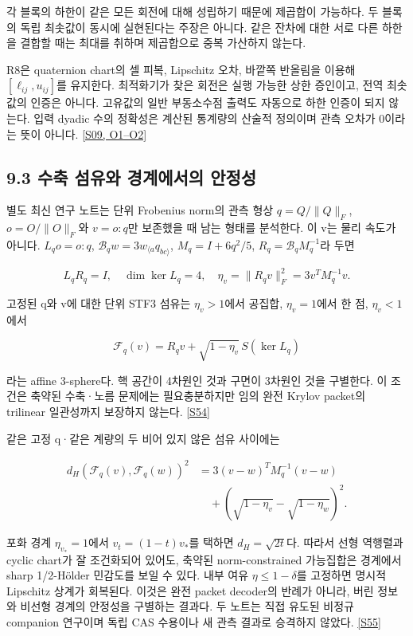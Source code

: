 \documentclass[11pt,a4paper]{article}
\begin{document}
각 블록의 하한이 같은 모든 회전에 대해 성립하기 때문에 제곱합이 가능하다. 두 블록의 독립 최솟값이 동시에 실현된다는 주장은 아니다. 같은 잔차에 대한 서로 다른 하한을 결합할 때는 최대를 취하며 제곱합으로 중복 가산하지 않는다.


R8은 quaternion chart의 셀 피복, Lipschitz 오차, 바깥쪽 반올림을 이용해 \([\ell_{ij},u_{ij}]\)를 유지한다. 최적화기가 찾은 회전은 실행 가능한 상한 증인이고, 전역 최솟값의 인증은 아니다. 고유값의 일반 부동소수점 출력도 자동으로 하한 인증이 되지 않는다. 입력 dyadic 수의 정확성은 계산된 통계량의 산술적 정의이며 관측 오차가 0이라는 뜻이 아니다. \hyperlink{src:S09}{[S09, O1–O2]}


\subsection*{9.3 수축 섬유와 경계에서의 안정성}

별도 최신 연구 노트는 단위 Frobenius norm의 관측 형상 \(q=Q/\|Q\|_F\), \(o=O/\|O\|_F\)와 \(v=o:q\)만 보존했을 때 남는 형태를 분석한다. 이 v는 물리 속도가 아니다. \(L_qo=o:q\), \(\mathcal B_qw=3w_{\langle a}q_{bc\rangle}\), \(M_q=I+6q^2/5\), \(R_q=\mathcal B_qM_q^{-1}\)라 두면


\[
L_qR_q=I,\quad \dim\ker L_q=4,\quad
\eta_v=\|R_qv\|_F^2=3v^TM_q^{-1}v.
\]

고정된 q와 v에 대한 단위 STF3 섬유는 \(\eta_v>1\)에서 공집합, \(\eta_v=1\)에서 한 점, \(\eta_v<1\)에서


\[
\mathcal F_q(v)=R_qv+\sqrt{1-\eta_v}\,S(\ker L_q)
\]

라는 affine 3-sphere다. 핵 공간이 4차원인 것과 구면이 3차원인 것을 구별한다. 이 조건은 축약된 수축·노름 문제에는 필요충분하지만 임의 완전 Krylov packet의 trilinear 일관성까지 보장하지 않는다. \hyperlink{src:S54}{[S54]}


같은 고정 q·같은 계량의 두 비어 있지 않은 섬유 사이에는


\[
\begin{aligned}
d_H(\mathcal F_q(v),\mathcal F_q(w))^2
&=3(v-w)^TM_q^{-1}(v-w)\\
&\quad+\left(\sqrt{1-\eta_v}-\sqrt{1-\eta_w}\right)^2.
\end{aligned}
\]

포화 경계 \(\eta_{v_*}=1\)에서 \(v_t=(1-t)v_*\)를 택하면 \(d_H=\sqrt{2t}\)다. 따라서 선형 역행렬과 cyclic chart가 잘 조건화되어 있어도, 축약된 norm-constrained 가능집합은 경계에서 sharp 1/2-Hölder 민감도를 보일 수 있다. 내부 여유 \(\eta\le1-\delta\)를 고정하면 명시적 Lipschitz 상계가 회복된다. 이것은 완전 packet decoder의 반례가 아니라, 버린 정보와 비선형 경계의 안정성을 구별하는 결과다. 두 노트는 직접 유도된 비정규 companion 연구이며 독립 CAS 수용이나 새 관측 결과로 승격하지 않았다. \hyperlink{src:S55}{[S55]}
\end{document}
